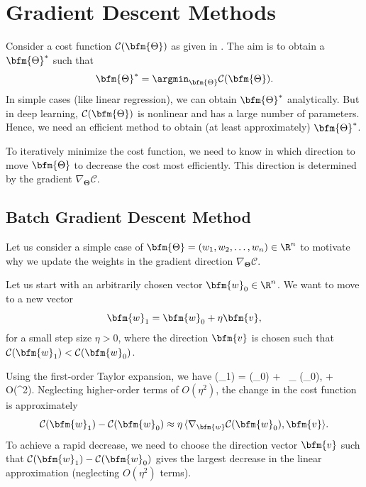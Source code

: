 \section{Gradient Descent Methods}
\label{gradient.descent.methods.sec}
Consider a cost function $\mathcal{C}(\bfm{\Theta})$ as given in . The aim is to obtain a $\bfm{\Theta}^*$ 
such that
$$\bfm{\Theta}^* = \argmin_{\bfm{\Theta}} \mathcal{C}(\bfm{\Theta}).$$
In simple cases (like linear regression), we can obtain $\bfm{\Theta}^*$ analytically. But in deep learning, $\mathcal{C}(\bfm{\Theta})$ is nonlinear and has a large number of parameters. Hence, we need an efficient method to obtain (at least approximately) $\bfm{\Theta}^*$. 

To iteratively minimize the cost function, we need to know in which direction to move $\bfm{\Theta}$ to decrease the cost most efficiently.  This direction is determined by the gradient $\nabla_{\boldsymbol{\Theta}}\mathcal{C}$.

\subsection{Batch Gradient Descent Method}
Let us consider a simple case of $\bfm{\Theta}=(w_1, w_2, \ldots, w_n)\in \R^n$ to motivate why we update the weights in the gradient direction $\nabla_{\boldsymbol{\Theta}}\mathcal{C}$.  

Let us start with an arbitrarily chosen vector $\bfm{w}_0\in \R^n$. We want to move to a new vector 
$$\bfm{w}_1 = \bfm{w}_0 + \eta \bfm{v},$$ 
for a small step size $\eta>0$, where the direction $\bfm{v}$ is chosen such that $\mathcal{C}(\bfm{w}_1) < \mathcal{C}(\bfm{w}_0)$. 

Using the first-order Taylor expansion, we have
\nbea
{}(_1) = (_0) + \eta \, \langle \nabla_{} (_0),  \rangle + O(\eta^2).
\neea
Neglecting higher-order terms of $O(\eta^2)$, the change in the cost function is approximately
$$
\mathcal{C}(\bfm{w}_1) - \mathcal{C}(\bfm{w}_0) \approx  \eta \, \langle \nabla_{\bfm{w}} \mathcal{C}(\bfm{w}_0), \bfm{v} \rangle.
$$
To achieve a rapid decrease, we need to choose the direction vector $\bfm{v}$ such that $\mathcal{C}(\bfm{w}_1) - \mathcal{C}(\bfm{w}_0)$ gives the largest decrease in the linear approximation (neglecting $O(\eta^2)$ terms).

